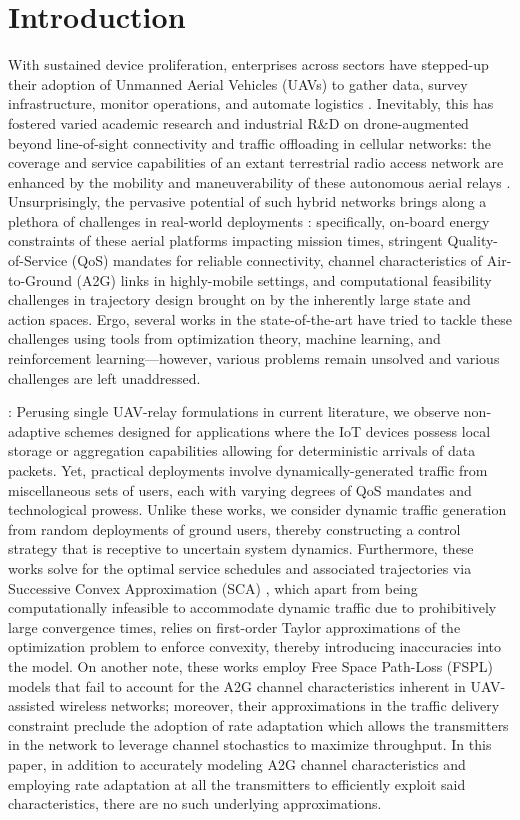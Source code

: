 \documentclass[10pt,twocolumn]{IEEEtran}
\begin{document}
\section{Introduction}\label{I}
With sustained device proliferation, enterprises across sectors have stepped-up their adoption of Unmanned Aerial Vehicles (UAVs) to gather data, survey infrastructure, monitor operations, and automate logistics \cite{UAVSurvey}. Inevitably, this has fostered varied academic research and industrial R\&D on drone-augmented beyond line-of-sight connectivity and traffic offloading in cellular networks: the coverage and service capabilities of an extant terrestrial radio access network are enhanced by the mobility and maneuverability of these autonomous aerial relays \cite{FundamentalTradeoffs}. Unsurprisingly, the pervasive potential of such hybrid networks brings along a plethora of challenges in real-world deployments \cite{FundamentalTradeoffs}: specifically, on-board energy constraints of these aerial platforms impacting mission times, stringent Quality-of-Service (QoS) mandates for reliable connectivity, channel characteristics of Air-to-Ground (A2G) links in highly-mobile settings, and computational feasibility challenges in trajectory design brought on by the inherently large state and action spaces. Ergo, several works in the state-of-the-art have tried to tackle these challenges using tools from optimization theory, machine learning, and reinforcement learning---however, various problems remain unsolved and various challenges are left unaddressed.

: Perusing single UAV-relay formulations in current literature, we observe non-adaptive schemes \cite{SCA, PAoI, Rician} designed for applications where the IoT devices possess local storage or aggregation capabilities allowing for deterministic arrivals of data packets. Yet, practical deployments involve dynamically-generated traffic from miscellaneous sets of users, each with varying degrees of QoS mandates and technological prowess. Unlike these works, we consider dynamic traffic generation from random deployments of ground users, thereby constructing a control strategy that is receptive to uncertain system dynamics. Furthermore, these works solve for the optimal service schedules and associated trajectories via Successive Convex Approximation (SCA) \cite{SCA, PAoI, Rician}, which apart from being computationally infeasible to accommodate dynamic traffic due to prohibitively large convergence times, relies on first-order Taylor approximations of the optimization problem to enforce convexity, thereby introducing inaccuracies into the model. On another note, these works employ Free Space Path-Loss (FSPL) models that fail to account for the A2G channel characteristics inherent in UAV-assisted wireless networks; moreover, their approximations in the traffic delivery constraint preclude the adoption of rate adaptation which allows the transmitters in the network to leverage channel stochastics to maximize throughput. In this paper, in addition to accurately modeling A2G channel characteristics and employing rate adaptation at all the transmitters to efficiently exploit said characteristics, there are no such underlying approximations.
\end{document}
